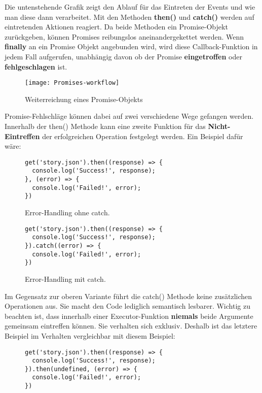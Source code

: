 \noindent
Die untenstehende Grafik zeigt den Ablauf für das Eintreten der Events und wie man diese dann verarbeitet. Mit den Methoden \textbf{then()} und \textbf{catch()} werden auf eintretenden Aktionen reagiert. Da beide Methoden ein Promise-Objekt zurückgeben, können Promises reibungslos aneinandergekettet werden. Wenn \textbf{finally} an ein Promise Objekt angebunden wird, wird diese Callback-Funktion in jedem Fall aufgerufen, unabhängig davon ob der Promise \textbf{eingetroffen} oder \textbf{fehlgeschlagen} ist.


\begin{figure}[H]
\texttt{[image: Promises-workflow]}
\caption{Weiterreichung eines Promise-Objekts \cite{promise-executor}}
\end{figure}

\noindent
Promise-Fehlschläge können dabei auf zwei verschiedene Wege gefangen werden. Innerhalb der then() Methode kann eine zweite Funktion für das \textbf{Nicht-Eintreffen} der erfolgreichen Operation festgelegt werden. Ein Beispiel dafür wäre:

\begin{figure}[H]
\begin{lstlisting}
get('story.json').then((response) => {
  console.log('Success!', response);
}, (error) => {
  console.log('Failed!', error);
})
\end{lstlisting}
\caption{Error-Handling ohne catch. \cite{callback-vs-promises}}
\end{figure}

\begin{figure}[H]
\begin{lstlisting}
get('story.json').then((response) => {
  console.log('Success!', response);
}).catch((error) => {
  console.log('Failed!', error);
})
\end{lstlisting}
\caption{Error-Handling mit catch. \cite{callback-vs-promises}}
\end{figure}

\noindent
Im Gegensatz zur oberen Variante führt die catch() Methode keine zusätzlichen Operationen aus. Sie macht den Code lediglich semantisch lesbarer. Wichtig zu beachten ist, dass innerhalb einer Executor-Funktion \textbf{niemals} beide Argumente gemeinsam eintreffen können. Sie verhalten sich exklusiv. Deshalb ist das letztere Beispiel im Verhalten vergleichbar mit diesem Beispiel:

\begin{figure}[H]
\begin{lstlisting}
get('story.json').then((response) => {
  console.log('Success!', response);
}).then(undefined, (error) => {
  console.log('Failed!', error);
})
\end{lstlisting}
\end{figure}

